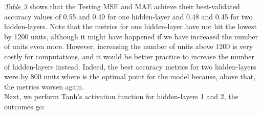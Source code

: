 \hyperref[table:Results for RNN, Sigmoid, High]{\textit{Table 3}} shows that the Testing MSE and MAE achieve their best-validated accuracy values of 0.55 and 0.49 for one hidden-layer and 0.48 and 0.45 for two hidden-layers. Note that the metrics for one hidden-layer have not hit the lowest by 1200 units, although it might have happened if we have increased the number of units even more. However, increasing the number of units above 1200 is very costly for computations, and it would be better practice to increase the number of hidden-layers instead. Indeed, the best accuracy metrics for two hidden-layers were by 800 units where is the optimal point for the model because, above that, the metrics worsen again.\\

Next, we perform Tanh's activation function for hidden-layers 1 and 2, the outcomes go:

